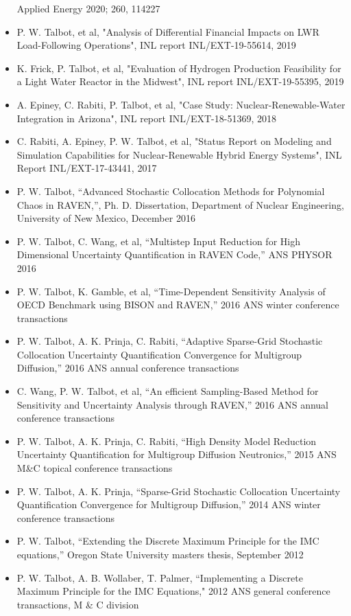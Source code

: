 \documentclass{res}
\begin{document}
\begin{resume}
\begin{itemize}
    Applied Energy 2020; 260, 114227
  \item P. W. Talbot, et al, "Analysis of Differential Financial Impacts on LWR Load-Following Operations", INL
	  report INL/EXT-19-55614, 2019
  \item K. Frick, P. Talbot, et al, "Evaluation of Hydrogen Production Feasibility for a Light Water Reactor
	  in the Midwest", INL report INL/EXT-19-55395, 2019
  \item A. Epiney, C. Rabiti, P. Talbot, et al, "Case Study: Nuclear-Renewable-Water Integration in Arizona", INL report INL/EXT-18-51369, 2018
  \item C. Rabiti, A. Epiney, P. W. Talbot, et al, "Status Report on Modeling and Simulation Capabilities for Nuclear-Renewable Hybrid Energy Systems", INL Report INL/EXT-17-43441, 2017
  \item P. W. Talbot, ``Advanced Stochastic Collocation Methods for Polynomial Chaos in RAVEN,'', Ph. D.
    Dissertation, Department of Nuclear Engineering, University of New Mexico, December 2016
  \item P. W. Talbot, C. Wang, et al, ``Multistep Input Reduction for High
    Dimensional Uncertainty Quantification in RAVEN Code,'' ANS PHYSOR 2016
  \item P. W. Talbot, K. Gamble, et al, ``Time-Dependent Sensitivity Analysis of OECD Benchmark using BISON
    and RAVEN,'' 2016 ANS winter conference transactions
  \item P. W. Talbot, A. K. Prinja, C. Rabiti, ``Adaptive Sparse-Grid Stochastic Collocation Uncertainty
    Quantification Convergence for Multigroup Diffusion,'' 2016 ANS annual conference transactions
  \item C. Wang, P. W. Talbot, et al, ``An efficient Sampling-Based Method for Sensitivity and
    Uncertainty Analysis through RAVEN,'' 2016 ANS annual conference transactions
  \item P. W. Talbot, A. K. Prinja, C. Rabiti, ``High Density Model Reduction Uncertainty Quantification
    for Multigroup Diffusion Neutronics,'' 2015 ANS M\&C topical conference transactions
  \item P. W. Talbot, A. K. Prinja, ``Sparse-Grid Stochastic Collocation Uncertainty Quantification Convergence
    for Multigroup Diffusion,'' 2014 ANS winter conference transactions
  \item P. W. Talbot, ``Extending the Discrete Maximum Principle for the IMC equations,'' Oregon State University masters thesis, September 2012
  \item P. W. Talbot, A. B. Wollaber, T. Palmer, ``Implementing a Discrete Maximum Principle for the IMC Equations," 2012 ANS general conference transactions, M \& C division

\end{itemize}
\end{resume}
\end{document}
